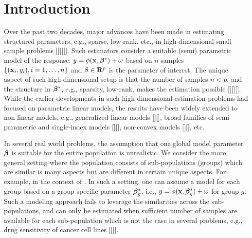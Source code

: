 
\section{Introduction}
Over the past two decades, major advances have been made in estimating structured parameters, e.g., sparse, low-rank, etc., in high-dimensional small sample problems [][][].
Such estimators consider a suitable (semi) parametric model of the response: $y = \phi(\mathbf{x},\boldsymbol{\beta}^*) + \omega$ based on $n$ samples $\{(\mathbf{x}_i,y_i),i=1,\ldots,n\}$ and $\beta \in \mathbf{R}^p$
is the parameter of interest. The unique aspect of such high-dimensional setup is that the number of samples $n < p$, and the structure in $\boldsymbol{\beta}^*$, e.g., sparsity, low-rank, makes
the estimation possible [][][]. While the earlier developments in such high dimensional estimation problems had focused on parametric linear models, the results
have been widely extended to non-linear models, e.g., generalized linear models [][], broad families of semi-parametric and single-index models [][], non-convex models [][], etc.

In several real world problems, the assumption that one global model parameter $\boldsymbol{\beta}$ is suitable for the entire population is unrealistic.
We consider the more general setting where the population consists of sub-populations (groups) which are similar is many aspects but are different in certain
unique aspects. For example, in the context of . 
%
%
In such a setting, one can assume a model for each group based on a group specific parameter $\boldsymbol{\beta}^*_g$, i.e., $y = \phi(\mathbf{x}, \boldsymbol{\beta}_g^*) + \omega$ for group $g$. 
Such a modeling approach fails to leverage the similarities across the sub-populations, and can only be estimated when sufficient number of samples are available 
for each sub-population which is not the case in several problems, e.g., drug sensitivity of cancer cell lines [][].
%

